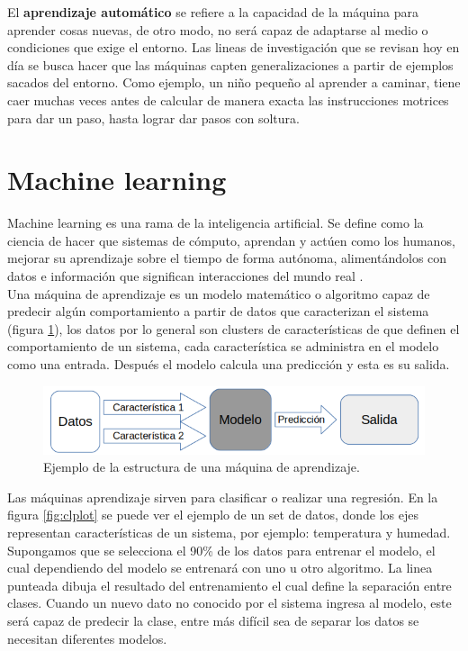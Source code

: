 \documentclass[twoside,spanish,ESP,MSc]{plantillaLabUPV}
\theoremstyle{definition}
\begin{document}
El \textbf{aprendizaje automático} se refiere a la capacidad de la máquina para aprender cosas nuevas, de otro modo, no será capaz de adaptarse al medio o condiciones que exige el entorno. Las lineas de investigación que se revisan hoy en día se busca hacer que las máquinas capten generalizaciones a partir de ejemplos sacados del entorno. Como ejemplo, un niño pequeño al aprender a caminar, tiene caer muchas veces antes de calcular de manera exacta las instrucciones motrices para dar un paso, hasta lograr dar pasos con soltura.


\section{Machine learning}

Machine learning es una rama de la inteligencia artificial. Se define como la ciencia de hacer que sistemas de cómputo, aprendan y actúen como los humanos, mejorar su aprendizaje sobre el tiempo de forma autónoma, alimentándolos con datos e información que significan interacciones del mundo real \cite{supervisadobook}.\\

Una máquina de aprendizaje es un modelo matemático o algoritmo capaz de predecir algún comportamiento a partir de datos que caracterizan el sistema (figura \ref{fml}), los datos por lo general son clusters de características de que definen el comportamiento de un sistema, cada característica se administra en el modelo como una entrada. Después el modelo calcula una predicción y esta es su salida.

\begin{figure}[h] 
	\centering 
		\includegraphics[scale=.50]{ima_mc/flujoml} 
	\caption{Ejemplo de la estructura de una máquina de aprendizaje.} 
	\label{fml} 
\end{figure}

Las máquinas aprendizaje sirven para clasificar o realizar una regresión. En la figura \ref{fig:clplot} se puede ver el ejemplo de un set de datos, donde los ejes representan características de un sistema, por ejemplo: temperatura y humedad. Supongamos que se selecciona el 90\% de los datos para entrenar el modelo, el cual dependiendo del modelo se entrenará con uno u otro algoritmo.
La linea punteada dibuja el resultado del entrenamiento el cual define la separación entre clases. Cuando un nuevo dato no conocido por el sistema ingresa al modelo, este será capaz de predecir la clase, entre más difícil sea de separar los datos se necesitan diferentes modelos.
\end{document}
